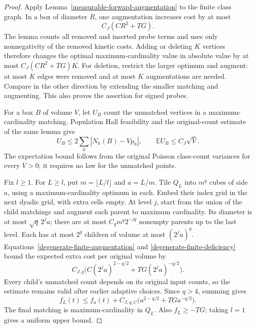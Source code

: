 \documentclass[11pt,reqno]{amsart}
\theoremstyle{definition}
\theoremstyle{remark}
\numberwithin{equation}{section}
\newcommand{\E}{\mathbb E}
\begin{document}
\begin{proof}
Apply Lemma~\ref{measurable-forward-augmentation} to the finite
class graph. In a box of diameter \(R\), one augmentation increases cost
by at most
\begin{equation}
\label{degenerate-finite-augmentation}
 C_J(CR^2+TG).
\end{equation}
The lemma counts all removed and inserted probe terms and uses only
nonnegativity of the removed kinetic costs. Adding or deleting \(K\)
vertices therefore changes the optimal maximum-cardinality value in
absolute value by at most \(C_J(CR^2+TG)K\). For deletion, restrict the
larger optimum and augment: at most \(K\) edges were removed and at
most \(K\) augmentations are needed. Compare in the other direction
by extending the smaller matching and augmenting. This also proves
the assertion for signed probes.

For a box \(B\) of volume \(V\), let \(U_B\) count the unmatched
vertices in a maximum-cardinality matching. Population Hall feasibility
and the original-count estimate of the same lemma give
\begin{equation}
\label{degenerate-finite-deficiency}
 U_B\le 2\sum_h|N_h(B)-Vp_h|,\qquad
 \E U_B\le C_J\sqrt V.
\end{equation}
The expectation bound follows from the original Poisson class-count
variances for every \(V>0\); it requires no law for the unmatched points.

Fix \(l\ge1\). For \(L\ge l\), put
\(m=\lfloor L/l\rfloor\) and \(a=L/m\). Tile \(Q_L\) into
\(m^q\) cubes of side \(a\), using a maximum-cardinality optimum in
each. Embed their index grid in the next dyadic grid, with extra cells
empty. At level \(j\), start from the union of the child matchings and
augment each parent to maximum cardinality. Its diameter is at most \(\sqrt q\,2^j a\);
there are at most \(C_qm^q2^{-jq}\) nonempty parents up to the last
level. Each has at most \(2^q\) children of volume at most
\((2^ja)^q\). Equations~\eqref{degenerate-finite-augmentation} and
\eqref{degenerate-finite-deficiency} bound the expected extra cost
per original volume by
\[
 C_{J,q}\bigl(C(2^ja)^{2-q/2}+TG(2^ja)^{-q/2}\bigr).
\]
Every child's unmatched count depends on its original input counts,
so the estimate remains valid after earlier adaptive choices. Since
\(q>4\), summing gives
\begin{equation}
\label{degenerate-finite-hierarchy}
 f_L(t)\le f_a(t)+C_{J,q,C}
             \bigl(a^{2-q/2}+TG a^{-q/2}\bigr).
\end{equation}
The final matching is maximum-cardinality in \(Q_L\).
Also \(f_L\ge-TG\); taking \(l=1\) gives a uniform upper bound.


\end{proof}
\end{document}
